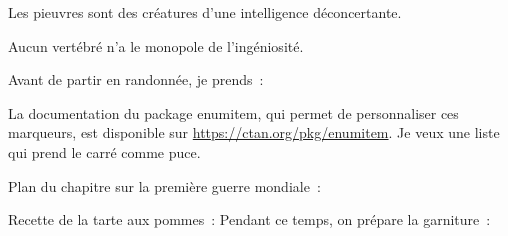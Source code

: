 \documentclass{article}
\begin{document}
Les pieuvres sont des créatures d'une intelligence déconcertante.



Aucun vertébré n'a le monopole de l'ingéniosité.

\hline

Avant de partir en randonnée, je prends~:



La documentation du package enumitem, qui permet de
personnaliser ces marqueurs, est disponible sur
\url{https://ctan.org/pkg/enumitem}. Je veux une liste qui prend le carré comme puce.

\hline

Plan du chapitre sur la première guerre mondiale~:



\hline



Recette de la tarte aux pommes~:
Pendant ce temps, on prépare la garniture~:
\end{document}
